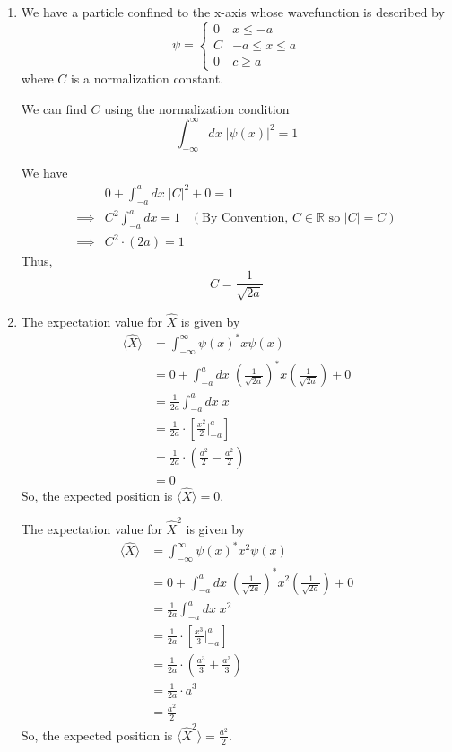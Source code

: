 \documentclass[twoside]{article}
\begin{document}
\begin{enumerate}
   \item We have a particle confined to the x-axis whose wavefunction is described by 
   \[ \psi = \begin{cases} 
      0 & x\leq -a \\
      C & -a\leq x\leq a \\
      0 & c \geq a
   \end{cases}
   \]
   where $C$ is a normalization constant.

   We can find $C$ using the normalization condition 
   \[ \int_{-\infty}^{\infty} dx\; |\psi(x)|^2 = 1\]

   We have 
   \begin{align*}
      &0 + \int_{-a}^{a} dx\; |C|^2 + 0 = 1 \\
      \implies& C^2 \int_{-a}^{a} dx = 1 \;\;\;(\text{By Convention, } C \in \mathbb{R} \text{ so } |C| = C) \\
      \implies& C^2 \cdot (2a) = 1 
   \end{align*}
   Thus,
   \[ \boxed{C = \frac{1}{\sqrt{2a}}} \]


   \item The expectation value for $\hat{X}$ is given by 
   \begin{align*}
      \langle \hat{X} \rangle &= \int_{-\infty}^{\infty} \psi(x)^{*} x \psi(x) \\
                              &= 0 + \int_{-a}^{a} dx\; \left(\frac{1}{\sqrt{2a}}\right)^{*} x \left(\frac{1}{\sqrt{2a}}\right) + 0 \\
                              &= \frac{1}{2a} \int_{-a}^{a} dx\; x \\
                              &= \frac{1}{2a} \cdot \left[ \frac{x^2}{2} \Biggr|_{-a}^{a} \right] \\
                              &= \frac{1}{2a} \cdot \left( \frac{a^2}{2} - \frac{a^2}{2} \right) \\
                              &= 0
   \end{align*}
   So, the expected position is $\boxed{ \langle \hat{X} \rangle = 0}$.


   The expectation value for $\hat{X}^2$ is given by 
   \begin{align*}
      \langle \hat{X} \rangle &= \int_{-\infty}^{\infty} \psi(x)^{*} x^2 \psi(x) \\
                              &= 0 + \int_{-a}^{a} dx\; \left(\frac{1}{\sqrt{2a}}\right)^{*} x^2 \left(\frac{1}{\sqrt{2a}}\right) + 0 \\
                              &= \frac{1}{2a} \int_{-a}^{a} dx\; x^2 \\
                              &= \frac{1}{2a} \cdot \left[ \frac{x^3}{3} \Biggr|_{-a}^{a} \right] \\
                              &= \frac{1}{2a} \cdot \left( \frac{a^3}{3} + \frac{a^3}{3} \right) \\
                              &= \frac{1}{2a} \cdot a^3 \\
                              &= \frac{a^2}{2}
   \end{align*}
   So, the expected position is $\boxed{ \langle \hat{X}^2 \rangle = \frac{a^2}{2}}$.


\end{enumerate}
\end{document}
